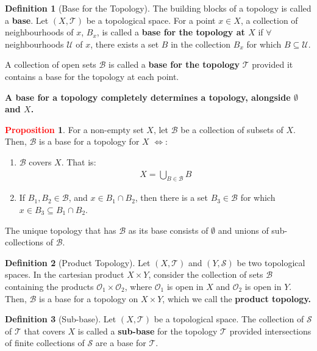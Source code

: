 \documentclass[11pt]{article}
\newcommand{\open}[0]{\mathcal{O}}
\newcommand{\topo}[0]{\mathcal{T}}
\theoremstyle{definition}
\theoremstyle{definition}
\theoremstyle{definition}
\newtheorem{definition}{\textcolor{OliveGreen}{Definition}}
\newtheorem{prop}{\textcolor{red}{Proposition}}
\theoremstyle{remark}
\begin{document}
\begin{definition}[Base for the Topology]
	The building blocks of a topology is called a \textbf{base}. Let $(X, \topo)$ be a topological space. For a point $x \in X$, a collection of neighbourhoods of $x$, $B_x$, is called a \textbf{base for the topology at $X$} if $\forall$ neighbourhoods $\mathcal{U}$ of $x$, there exists a set $B$ in the collection $B_x$ for which $B \subseteq \mathcal{U}$. 
	
	A collection of open sets $\mathcal{B}$ is called a \textbf{base for the topology} $\topo$ provided it contains a base for the topology at each point. 
\end{definition}

\begin{center} 
\textbf{A base for a topology completely determines a topology, alongside $\emptyset$ and $X$.}
\end{center} 

\begin{prop}
	For a non-empty set $X$, let $\mathcal{B}$ be a collection of subsets of $X$. Then, $\mathcal{B}$ is a base for a topology for $X$ $\iff$: 
	\begin{enumerate}[noitemsep]
		\item $\mathcal{B}$ covers $X$. That is:
		\begin{align}
			X = \bigcup_{B \in \mathcal{B}} B
		\end{align}
		\item If $B_1, B_2 \in \mathcal{B}$, and $x \in B_1 \cap B_2$, then there is a set $B_3 \in \mathcal{B}$ for which $x \in B_3 \subseteq B_1 \cap B_2$. 
	\end{enumerate}
	The unique topology that has $\mathcal{B}$ as its base consists of $\emptyset$ and unions of sub-collections of $\mathcal{B}$. 
\end{prop}

\begin{definition}[Product Topology]
	Let $(X, \topo)$ and $(Y, \mathcal{S})$ be two topological spaces. In the cartesian product $X \times Y$, consider the collection of sets $\mathcal{B}$ containing the products $\open_1 \times \open_2$, where $\open_1$ is open in $X$ and $\open_2$ is open in $Y$. Then, $\mathcal{B}$ is a base for a topology on $X \times Y$, which we call the \textbf{product topology.}
\end{definition}

\begin{definition}[Sub-base]
	Let $(X, \topo)$ be a topological space. The collection of $\mathcal{S}$ of $\topo$ that covers $X$ is called a \textbf{sub-base} for the topology $\topo$ provided intersections of finite collections of $\mathcal{S}$ are a base for $\topo$. 
\end{definition}
\end{document}
